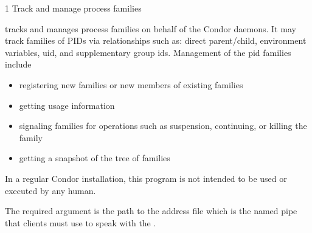 \begin{ManPage}{\label{man-condor-procd}}{1}
{Track and manage process families}
\Synopsis {}



\Description 

 tracks and manages process families on behalf of the
Condor daemons. 
It may track families of PIDs via relationships such
as: direct parent/child, environment variables, uid, and supplementary
group ids.  
Management of the pid families include 
\begin{itemize}
\item registering new families or new members of existing families
\item getting usage information
\item signaling families for operations such as suspension, 
continuing, or killing the family 
\item getting a snapshot of the tree of families 
\end{itemize}
In a regular Condor installation, 
this program is not intended to be used or executed by any human.

The required
argument is the path to the address file which is the named pipe
that clients must use to speak with the .
	
\begin{Options}

	

	
	


\end{Options}
\end{ManPage}
